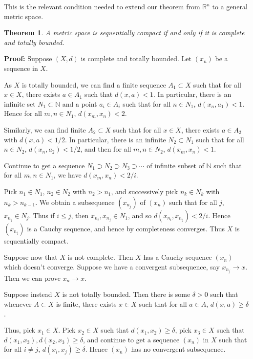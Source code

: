 \documentclass[12pt]{article}
\newtheorem{theorem}{Theorem}[section]
\theoremstyle{definition}
\theoremstyle{remark}
\begin{document}
This is the relevant condition needed to extend our theorem from $\mathbb{R}^{n}$ to a general metric space.

\begin{theorem}
	A metric space is sequentially compact if and only if it is complete and totally bounded.
\end{theorem}

\begin{adjustbox}{minipage = \columnwidth - 25.5pt, margin=1em, frame=1pt, margin=0em}
	\textbf{Proof:} Suppose $(X, d)$ is complete and totally bounded. Let $(x_n)$ be a sequence in $X$.

	As $X$ is totally bounded, we can find a finite sequence $A_1 \subset X$ such that for all $x \in X$, there exists $a \in A_1$ such that $d(x, a) < 1$. In particular, there is an infinite set $N_1 \subset \mathbb{N}$ and a point $a_i \in A_i$ such that for all $n \in N_1$, $d(x_n, a_1) < 1$. Hence for all $m, n \in N_1$, $d(x_m, x_n) < 2$.

	Similarly, we can find finite $A_2 \subset X$ such that for all $x \in X$, there exists $a \in A_2$ with $d(x, a) < 1/2$. In particular, there is an infinite $N_2 \subset N_1$ such that for all $n \in N_2$, $d(x_n, a_2) < 1/2$, and then for all $m, n \in N_2$, $d(x_m, x_n) < 1$.

	Continue to get a sequence $N_1 \supset N_2 \supset N_3 \supset \cdots$ of infinite subset of $\mathbb{N}$ such that for all $m, n \in N_1$, we have $d(x_m, x_n) < 2/i$.

\end{adjustbox}

\begin{adjustbox}{minipage = \columnwidth - 25.5pt, margin=1em, frame=1pt, margin=0em}
	Pick $n_1 \in N_1$, $n_2 \in N_2$ with $n_2 > n_1$, and successively pick $n_k \in N_k$ with $n_k > n_{k-1}$. We obtain a subsequence $(x_{n_j})$ of $(x_n)$ such that for all $j$, $x_{n_j} \in N_j$. Thus if $i \leq j$, then $x_{n_i}, x_{n_j} \in N_1$, and so $d(x_{n_i}, x_{n_j}) < 2/i$. Hence $(x_{n_j})$ is a Cauchy sequence, and hence by completeness converges. Thus $X$ is sequentially compact.

	Suppose now that $X$ is not complete. Then $X$ has a Cauchy sequence $(x_n)$ which doesn't converge. Suppose we have a convergent subsequence, say $x_{n_j}\to x$. Then we can prove $x_n \to x$.

	Suppose instead $X$ is not totally bounded. Then there is some $\delta > 0$ such that whenever $A \subset X$ is finite, there exists $x \in X$ such that for all $a \in A$, $d(x, a) \geq \delta$.

	Thus, pick $x_1 \in X$. Pick $x_2 \in X$ such that $d(x_1, x_2) \geq \delta$, pick $x_3 \in X$ such that $d(x_1, x_3), d(x_2, x_3) \geq \delta$, and continue to get a sequence $(x_n)$ in $X$ such that for all $i \neq j$, $d(x_i, x_j) \geq \delta$. Hence $(x_n)$ has no convergent subsequence.

\end{adjustbox}
\end{document}

